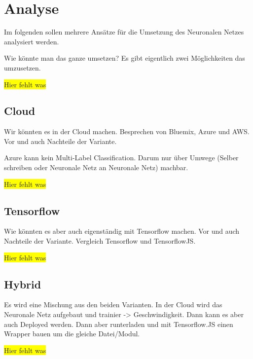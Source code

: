 \section{Analyse}
Im folgenden sollen mehrere Ansätze für die Umsetzung des Neuronalen Netzes analysiert werden.

Wie könnte man das ganze umsetzen? Es gibt eigentlich zwei Möglichkeiten das umzusetzen.

\colorbox{yellow}{Hier fehlt was}

\subsection{Cloud}
Wir könnten es in der Cloud machen. Besprechen von Bluemix, Azure und AWS. Vor und auch Nachteile der Variante.

Azure kann kein Multi-Label Classification. Darum nur über Umwege (Selber schreiben oder Neuronale Netz an Neuronale Netz)
machbar.

\colorbox{yellow}{Hier fehlt was}

\subsection{Tensorflow}
Wie könnten es aber auch eigenständig mit Tensorflow machen. Vor und auch Nachteile der Variante. Vergleich Tensorflow
und TensorflowJS.

\colorbox{yellow}{Hier fehlt was}

\subsection{Hybrid}
Es wird eine Mischung aus den beiden Varianten. In der Cloud wird das Neuronale Netz aufgebaut und trainier -> Geschwindigkeit.
Dann kann es aber auch Deployed werden. Dann aber runterladen und mit Tensorflow.JS einen Wrapper bauen um die gleiche
Datei/Modul.

\colorbox{yellow}{Hier fehlt was}